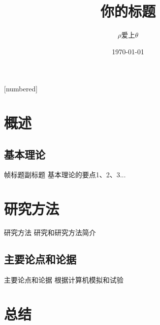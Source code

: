 \documentclass[14pt,hyperref={CJKbookmarks=true}]{beamer} %
\begin{document}
\newtheorem{THeorem}{定理}  %
\newtheorem{DEfinition}{定义} %
\newtheorem{PRoof}{证明}  %
\theoremstyle{example}
\newtheorem{EXample}{示例}  %
\kaishu
{}[numbered]  %
\title{你的标题}
\author{$\rho$爱上$\theta$}
\date{\today}
\begin{frame}
    \titlepage
\end{frame}
\section{概述}
\subsection{基本理论}
\begin{frame}{帧标题}{副标题}
    基本理论的要点1、2、3...
\end{frame}
\section{研究方法}
\begin{frame}{研究方法}
    研究和研究方法简介
\end{frame}
\subsection{主要论点和论据}
\begin{frame}{主要论点和论据}
    根据计算机模拟和试验
\end{frame}
\section{总结}
\end{document}
